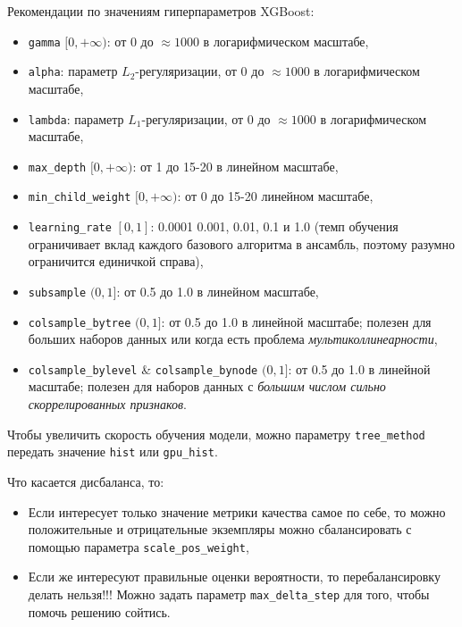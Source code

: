 \documentclass[%
	11pt,
	a4paper,
	utf8,
		]{article}
\begin{document}
Рекомендации по значениям гиперпараметров XGBoost:
\begin{itemize}
	\item \verb|gamma| $ [0, +\infty) $: от 0 до $ \approx 1000  $ в логарифмическом масштабе,
	
	\item \verb|alpha|: параметр $ L_2 $-регуляризации, от 0 до $ \approx 1000  $ в логарифмическом масштабе,
	
	\item \verb|lambda|: параметр $ L_1 $-регуляризации, от 0 до $ \approx 1000  $ в логарифмическом масштабе,
	
	\item \verb|max_depth| $ [0, +\infty) $: от 1 до 15-20 в линейном масштабе,
	
	\item \verb|min_child_weight| $ [0, +\infty) $: от 0 до 15-20 линейном масштабе,
	
	\item \verb|learning_rate| $ [0, 1] $: 0.0001 0.001, 0.01, 0.1 и 1.0 (темп обучения ограничивает вклад каждого базового алгоритма в ансамбль, поэтому разумно ограничится единичкой справа),
	
	\item \verb|subsample| $ (0, 1] $: от 0.5 до 1.0 в линейном масштабе,
	
	\item \verb|colsample_bytree| $ (0, 1] $: от 0.5 до 1.0 в линейной масштабе; полезен для больших наборов данных или когда есть проблема \emph{мультиколлинеарности},
	
	\item \verb|colsample_bylevel| \& \verb|colsample_bynode| $ (0, 1] $: от 0.5 до 1.0 в линейной масштабе; полезен для наборов данных с \emph{большим числом сильно скоррелированных признаков}.
\end{itemize}

Чтобы увеличить скорость обучения модели, можно параметру \verb|tree_method| передать значение \verb|hist| или \verb|gpu_hist|.

Что касается дисбаланса, то:
\begin{itemize}
	\item Если интересует только значение метрики качества самое по себе, то можно положительные и отрицательные экземпляры можно сбалансировать с помощью параметра \verb|scale_pos_weight|,
	
	\item Если же интересуют правильные оценки вероятности, то перебалансировку делать нельзя!!! Можно задать параметр \verb|max_delta_step| для того, чтобы помочь решению сойтись.
\end{itemize}
\end{document}
